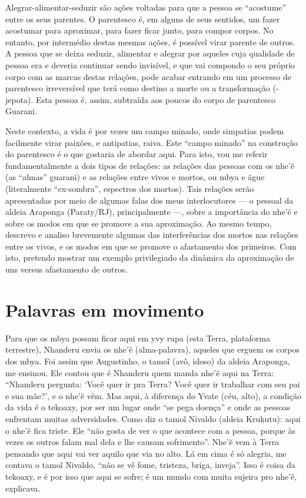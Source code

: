 Alegrar-alimentar-seduzir são ações voltadas para que a pessoa se
``acostume'' entre os seus parentes. O parentesco é, em alguns de seus
sentidos, um fazer acostumar para aproximar, para fazer ficar junto,
para compor corpos. No entanto, por intermédio destas mesmas ações, é
possível virar parente de outros. A pessoa que se deixa seduzir,
alimentar e alegrar por aqueles cuja qualidade de pessoa era e deveria
continuar sendo invisível, e que vai compondo o seu próprio corpo com
as marcas destas relações, pode acabar entrando em um processo de
parentesco irreversível que terá como destino a morte ou a
transformação (-jepota). Esta pessoa é, assim, subtraída aos poucos do
corpo de parentesco Guarani.

Neste contexto, a vida é por vezes um campo minado, onde simpatias podem
facilmente virar paixões, e antipatias, raiva. Este ``campo minado'' na
construção do parentesco é o que gostaria de abordar aqui. Para isto,
vou me referir fundamentalmente a dois tipos de relações: as relações
das pessoas com os nhe’\~{e} (as ``almas'' guarani) e as relações entre
vivos e mortos, ou mbya e ãgue (literalmente ``ex-sombra'', espectros dos
mortos). Tais relações serão apresentadas por meio de algumas falas dos
meus interlocutores — o pessoal da aldeia Araponga (Paraty/RJ),
principalmente —, sobre a importância do nhe’\~{e} e sobre os modos
em que se promove a sua aproximação. Ao mesmo tempo, descrevo e analiso
brevemente algumas das interferências dos mortos nas relações entre os
vivos, e os modos em que se promove o afastamento dos primeiros. Com
isto, pretendo mostrar um exemplo privilegiado da dinâmica da
aproximação de uns versus afastamento de outros.

\section{Palavras em movimento}

Para que os mbya possam ficar aqui em yvy rupa (esta Terra, plataforma
terrestre), Nhanderu envia os nhe’\~{e} (alma-palavra), aqueles que
erguem os corpos dos mbya. Foi assim que Augustinho, o tamo\~{i} (avô,
idoso) da aldeia Araponga, me ensinou. Ele contou que é Nhanderu quem
manda nhe’\~{e} aqui na Terra: ``Nhanderu pergunta: ‘Você quer ir pra
Terra? Você quer ir trabalhar com seu pai e sua mãe?’, e o nhe’\~{e}
vêm. Mas aqui, à diferença do Yvate (céu, alto), a condição da vida é o
tekoaxy, por ser um lugar onde ``se pega doença'' e onde as pessoas
enfrentam muitas adversidades. Como diz o tamo\~{i} Nivaldo (aldeia
Krukutu): aqui o nhe’\~{e} fica triste. Ele ``não gosta de ver o que
acontece com a pessoa, porque às vezes os outros falam mal dela e lhe
causam sofrimento''. Nhe’\~{e} vem à Terra pensando que aqui vai ver
aquilo que via no alto. Lá em cima é só
alegria, me contava o tamo\~{i} Nivaldo, ``não se vê
fome, tristeza, briga, inveja''. Isso é coisa da tekoaxy, e é por isso
que aqui se sofre; é um mundo com muita sujeira pro
nhe’\~{e}, explicava. 

